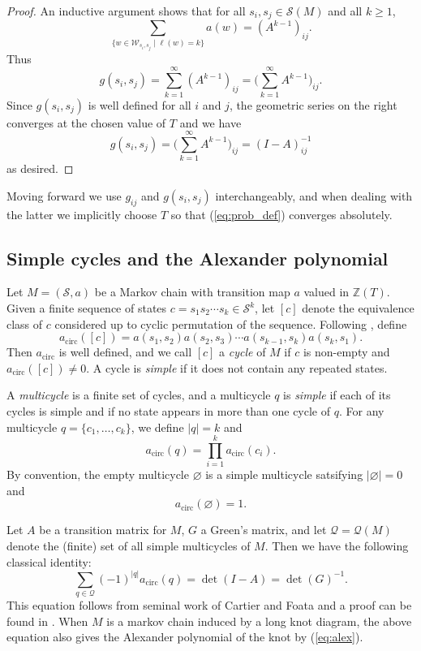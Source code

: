 \documentclass[11pt,hyp,]{nyjm}
\newcommand{\Z}{\mathbb{Z}}
\numberwithin{thm}{section}
\theoremstyle{definition}
\theoremstyle{remark}
\begin{document}
	\begin{proof}
		An inductive argument shows that for all $s_i, s_j \in \mathcal{S}(M)$ and all $k \geq 1$,
		$$
		\sum_{\{w \in \mathcal{W}_{s_i,s_j} \mid \ell(w) = k\}} a(w) = (A^{k - 1})_{ij}.
		$$
		Thus
		$$
		g(s_i,s_j) = \sum_{k = 1}^\infty (A^{k - 1})_{ij} = \big(\sum_{k = 1}^\infty A^{k - 1} \big)_{ij}.
		$$
		Since $g(s_i,s_j)$ is well defined for all $i$ and $j$, the geometric series on the right converges at the chosen value of $T$ and we have
		$$
		g(s_i,s_j) = \big(\sum_{k = 1}^\infty A^{k - 1} \big)_{ij} = (I - A)^{-1}_{ij}
		$$
		as desired.
	\end{proof}
	
	Moving forward we use $g_{ij}$ and $g(s_i,s_j)$ interchangeably, and when dealing with the latter we implicitly choose $T$ so that (\ref{eq:prob_def}) converges absolutely.
	
	\subsection{Simple cycles and the Alexander polynomial}
	\label{sec:hikes}
	
	Let $M = (\mathcal{S}, a)$ be a Markov chain with transition map $a$ valued in $\Z(T)$. Given a finite sequence of states $c = s_1s_2 \cdots s_k \in \mathcal{S}^k$, let $[c]$ denote the equivalence class of $c$ considered up to cyclic permutation of the sequence. Following \cite{lw01, foze99}, define
	$$
	a_\text{circ}([c]) = a(s_1,s_2)a(s_2,s_3) \cdots a(s_{k - 1}, s_k)a(s_k,s_1).
	$$
	Then $a_\text{circ}$ is well defined, and we call $[c]$ a {\em cycle} of $M$ if $c$ is non-empty and $a_\text{circ}([c]) \neq 0$. A cycle is {\em simple} if it does not contain any repeated states.
	
	A {\em multicycle} is a finite set of cycles, and a multicycle $q$ is {\em simple} if each of its cycles is simple and if no state appears in more than one cycle of $q$. For any multicycle $q = \{c_1, \dots, c_k\}$, we define $|q| = k$ and
	$$
	a_\text{circ}(q) = \prod_{i = 1}^k a_\text{circ}(c_i).
	$$
	By convention, the empty multicycle $\varnothing$ is a simple multicycle satsifying $|\varnothing| = 0$ and
	$$
	a_\text{circ}(\varnothing) = 1.
	$$
	
	Let $A$ be a transition matrix for $M$, $G$ a Green's matrix, and let $\mathcal{Q} = \mathcal{Q}(M)$ denote the (finite) set of all simple multicycles of $M$. Then we have the following classical identity:
	\begin{equation}
		\label{eq:cf}
		\sum_{q \in \mathcal{Q}} (-1)^{|q|} a_\text{circ}(q) =  \det(I - A) = \det(G)^{-1}.
	\end{equation}
	This equation follows from seminal work of Cartier and Foata \cite{cafo69} and a proof can be found in \cite[Section 2.3]{giro17}. When $M$ is a markov chain induced by a long knot diagram, the above equation also gives the Alexander polynomial of the knot by (\ref{eq:alex}).
	
\end{document}
